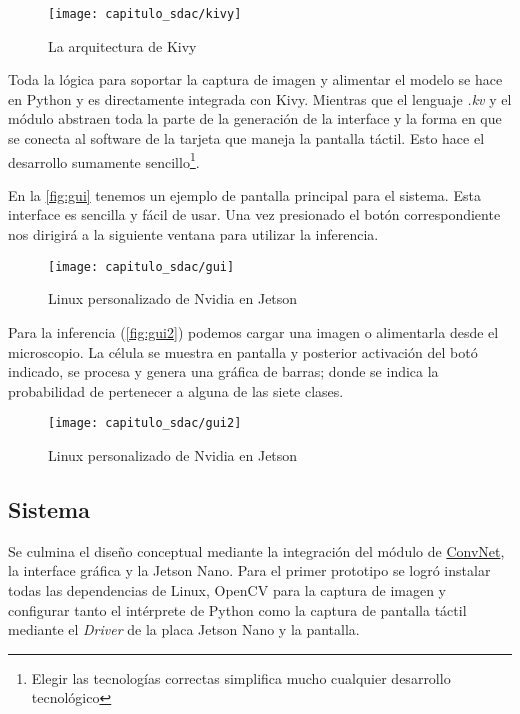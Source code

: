 \begin{figure}[H]
    \centering
    \texttt{[image: capitulo\_sdac/kivy]}
    \caption{La arquitectura de Kivy}\label{fig:kivy}
\end{figure}

Toda la lógica para soportar la captura de imagen y alimentar el modelo se hace
en Python y es directamente integrada con Kivy. Mientras que el lenguaje \emph{.kv} y
el módulo abstraen toda la parte de la generación de la interface y la forma en
que se conecta al software de la tarjeta que maneja la pantalla táctil. Esto
hace el desarrollo sumamente sencillo\footnote{Elegir las tecnologías correctas simplifica
mucho cualquier desarrollo tecnológico}.

En la \autoref{fig:gui} tenemos un ejemplo de pantalla principal para el
sistema. Esta interface es sencilla y fácil de usar. Una vez presionado el botón
correspondiente nos dirigirá a la siguiente ventana para utilizar la inferencia.

\begin{figure}[H]
    \centering
    \texttt{[image: capitulo\_sdac/gui]}
    \caption{Linux personalizado de Nvidia en Jetson}\label{fig:gui}
\end{figure}

Para la inferencia (\autoref{fig:gui2}) podemos cargar una imagen o alimentarla
desde el microscopio. La célula se muestra en pantalla y posterior activación
del botó indicado, se procesa y genera una gráfica de barras; donde se indica la
probabilidad de pertenecer a alguna de las siete clases.

\begin{figure}[H]
    \centering
    \texttt{[image: capitulo\_sdac/gui2]}
    \caption{Linux personalizado de Nvidia en Jetson}\label{fig:gui2}
\end{figure}


\subsection{Sistema}

Se culmina el diseño conceptual mediante la integración del módulo de
\hyperlink{abbr}{ConvNet}, la interface gráfica y la Jetson Nano. Para el primer
prototipo se logró instalar todas las dependencias de Linux, OpenCV para la
captura de imagen y configurar tanto el intérprete de Python como la captura de
pantalla táctil mediante el \emph{Driver} de la placa Jetson Nano y la pantalla.

